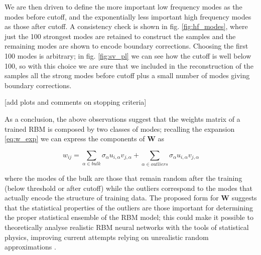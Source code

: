 \documentclass{revtex4-1}
\begin{document}
We are then driven to define the more important low frequency modes as the modes before cutoff, and the exponentially less important high frequency modes as those after cutoff. A consistency check is shown in fig. \ref{fig:hf_modes}, where just the 100 strongest modes are retained to construct the samples and the remaining modes are shown to encode boundary corrections. Choosing the first 100 modes is arbitrary; in fig. \ref{fig:sv_pl} we can see how the cutoff is well below 100, so with this choice we are sure that we included in the reconstruction of the samples all the strong modes before cutoff plus a small number of modes giving boundary corrections.

[add plots and comments on stopping criteria]

As a conclusion, the above observations suggest that the weights matrix of a trained RBM is composed by two classes of modes; recalling the expansion \eqref{eq:w_exp} we can express the components of \(\mathbf{W}\) as

\begin{equation}
w_{ij} = \sum_{\alpha \in bulk} \sigma_{\alpha} u_{i,\alpha} v_{j,\alpha} + \sum_{\alpha \in outliers} \sigma_{\alpha} u_{i,\alpha} v_{j,\alpha}
\end{equation}

where the modes of the bulk are those that remain random after the training (below threshold or after cutoff) while the outliers correspond to the modes that actually encode the structure of training data. The proposed form for \(\mathbf{W}\) suggests that the statistical properties of the outliers are those important for determining the proper statistical ensemble of the RBM model; this could make it possible to theoretically analyse realistic RBM neural networks with the tools of statistical physics, improving current attempts relying on unrealistic random approximations \cite{monasson}.
\end{document}
